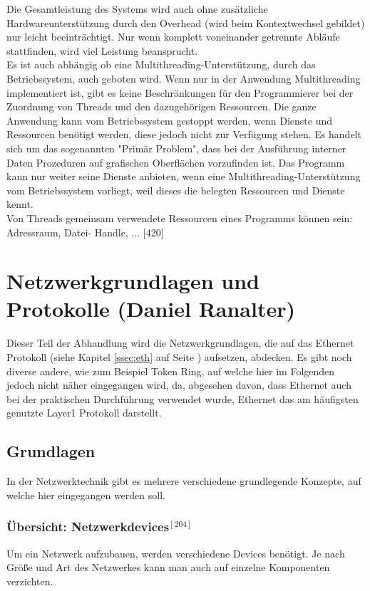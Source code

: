 \documentclass[12pt,a4paper]{report}
\begin{document}
\begin{onehalfspace}
Die Gesamtleistung des Systems wird auch ohne zusätzliche Hardwareunterstützung durch den Overhead (wird beim Kontextwechsel gebildet) nur leicht beeinträchtigt. Nur wenn komplett voneinander getrennte Abläufe stattfinden, wird viel Leistung beansprucht.\\

Es ist auch abhängig ob eine Multithreading-Unterstützung, durch das Betriebssystem, auch geboten wird. Wenn nur in der Anwendung Multithreading implementiert ist, gibt es keine Beschränkungen für den Programmierer bei der Zuordnung von Threads und den dazugehörigen Ressourcen. Die ganze Anwendung kann vom Betriebssystem gestoppt werden, wenn Dienste und Ressourcen benötigt werden, diese jedoch nicht zur Verfügung stehen. Es handelt sich um das sogenannten "{}Primär Problem"{}, dass bei der Ausführung interner Daten Prozeduren auf grafischen Oberflächen vorzufinden ist. Das Programm kann nur weiter seine Dienste anbieten, wenn eine Multithreading-Unterstützung vom Betriebssystem vorliegt, weil dieses die belegten Ressourcen und Dienste kennt.\\

Von Threads gemeinsam verwendete Ressourcen eines Programms können sein: Adressraum, Datei- Handle, ... [420]
\newpage
{}
\chapter{Netzwerkgrundlagen und Protokolle (Daniel Ranalter)}
Dieser Teil der Abhandlung wird die Netzwerkgrundlagen, die auf das Ethernet Protokoll (siehe Kapitel \ref{ssec:eth} auf Seite \pageref{ssec:eth}) aufsetzen, abdecken. Es gibt noch diverse andere, wie zum Beispiel Token Ring, auf welche hier im Folgenden jedoch nicht näher eingegangen wird, da, abgesehen davon, dass Ethernet auch bei der praktischen Durchführung verwendet wurde, Ethernet das am häufigsten genutzte Layer1 Protokoll darstellt. 

\section{Grundlagen}
In der Netzwerktechnik gibt es mehrere verschiedene grundlegende Konzepte, auf welche hier eingegangen werden soll.

\subsection*{Übersicht: Netzwerkdevices$^{[204]}$}
Um ein Netzwerk aufzubauen, werden verschiedene Devices benötigt. Je nach Größe und Art des Netzwerkes kann man auch auf einzelne Komponenten verzichten. 


\end{onehalfspace}
\end{document}
